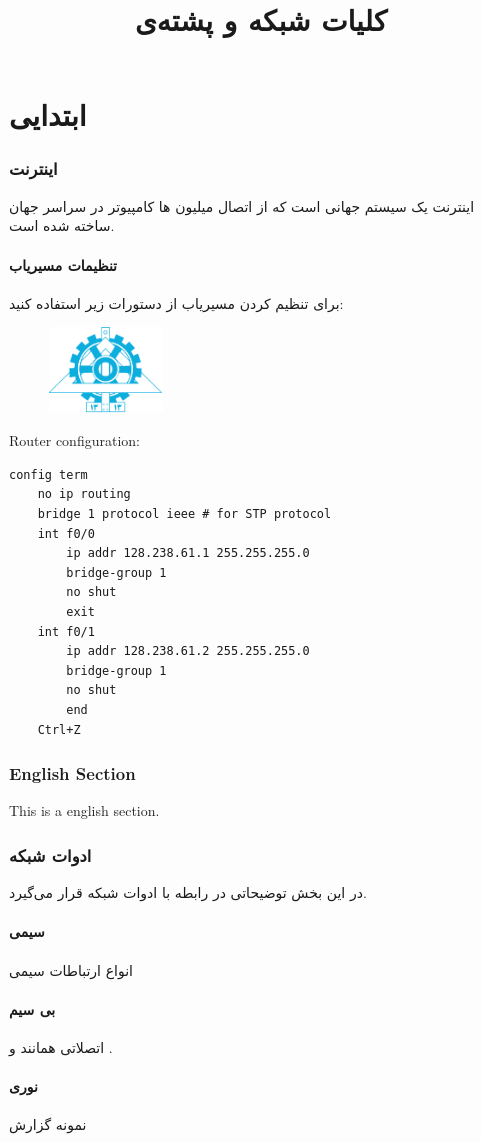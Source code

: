 \documentclass{../UTNetLabFa}
\title{کلیات شبکه و پشته‌ی \textLR{TCP-IP}}
\begin{document}
	

\part{ابتدایی}
    \section{اینترنت}
    اینترنت یک سیستم جهانی است که از اتصال میلیون ها کامپیوتر در سراسر جهان ساخته شده است.
\subsection{تنظیمات مسیریاب}
    برای تنظیم کردن مسیریاب از دستورات زیر استفاده کنید:

    \begin{figure}[h]
    	\centering
        {\includegraphics[height=64pt]{../img/fanni}}
    \end{figure}

{
    Router configuration:
        \begin{lstlisting}[language={cisco}]
config term
    no ip routing
    bridge 1 protocol ieee # for STP protocol
    int f0/0
        ip addr 128.238.61.1 255.255.255.0
        bridge-group 1
        no shut
        exit
    int f0/1
        ip addr 128.238.61.2 255.255.255.0
        bridge-group 1
        no shut
        end
    Ctrl+Z
    \end{lstlisting}
}

\begin{otherlanguage}{english}
	\section{English Section}
	This is a english section.
\end{otherlanguage}

\section{ادوات شبکه}
در این بخش توضیحاتی در رابطه با ادوات شبکه قرار می‌گیرد.
\subsection{سیمی}
انواع ارتباطات سیمی

\subsection{بی سیم}
	اتصلاتی همانند  و .
\subsection{نوری}
\begin{report}
\item نمونه گزارش
\end{report}
\end{document}
